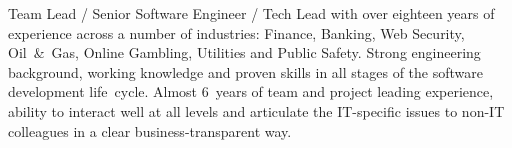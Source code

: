 \documentclass{res}
\newcommand{\osection}[1]{\section{\sc {\Large \textbf{#1}\\}} \vspace{0.30cm}}
\begin{document}
\begin{resume}

\indent Team Lead / Senior Software Engineer / Tech Lead with over eighteen years of experience
across a number of industries: Finance, Banking, Web Security, Oil~\&~Gas, Online Gambling, Utilities and Public Safety. Strong engineering background, working knowledge and proven skills in all stages of the software development life~cycle. Almost 6~years of team and project leading experience, ability to interact well at all levels and articulate the IT-specific issues to non-IT colleagues in a clear business-transparent way.


\end{resume}
\end{document}
